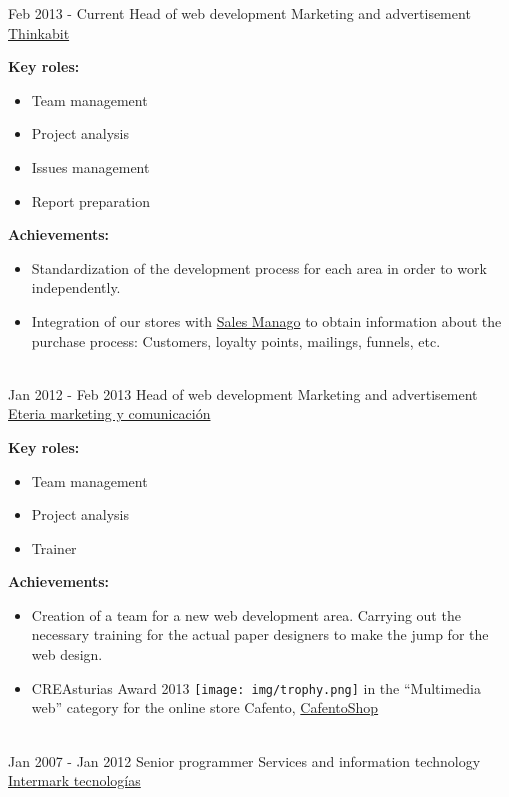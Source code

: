 \documentclass[letterpaper]{twentysecondcv} %
\begin{document}
\begin{twenty} %
  \twentyitem
  {Feb 2013 -}
  {Current}
  {Head of web development}
  {Marketing and advertisement}
  {\href{http://www.thinkabit.es/}{Thinkabit}}
  {

    \textbf{Key roles:}
    \begin{itemize}
    \item Team management
    \item Project analysis
    \item Issues management
    \item Report preparation
    \end{itemize}

    \textbf{Achievements:}
    \begin{itemize}
    \item Standardization of the development process for each area in order to work independently.
    \item Integration of our stores with \href{http://salesmanago.com/}{Sales
        Manago} to obtain information about the purchase process: Customers,
      loyalty points, mailings, funnels, etc.
    \end{itemize}
  }
  \\
  \twentyitem
  {Jan 2012 -}
  {Feb 2013}
  {Head of web development}
  {Marketing and advertisement}
  {\href{http://www.eteria.es}{Eteria marketing y comunicación}}
  {

    \textbf{Key roles:}
    \begin{itemize}
    \item Team management
    \item Project analysis
    \item Trainer
    \end{itemize}

    \textbf{Achievements:}
    \begin{itemize}
    \item Creation of a team for a new web development area. Carrying out the
      necessary training for the actual paper designers to make the jump for
      the web design.
    \item CREAsturias Award 2013 {\texttt{[image: img/trophy.png]}}
      in the ``Multimedia web'' category for the online store Cafento, \href{https://www.cafentoshop.com/}{CafentoShop}
    \end{itemize}
  }
  \\
  \twentyitem
  {Jan 2007 -}
  {Jan 2012}
  {Senior programmer}
  {Services and information technology}
  {\href{http://www.intermarktecnologias.com/}{Intermark tecnologías}}
  {

}
\end{twenty}
\end{document}
